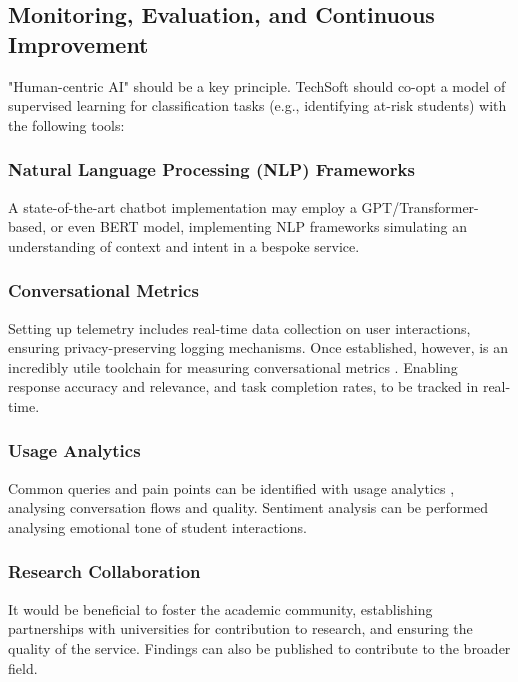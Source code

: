 \documentclass[14pt,a4paper]{article}
\begin{document}
\begin{multicols}{2}
\subsection{Monitoring, Evaluation, and Continuous Improvement}
 "Human-centric AI" should be a key principle.
 TechSoft should co-opt a model of supervised learning for classification tasks (e.g., identifying at-risk students) with the following tools:

\subsubsection{Natural Language Processing (NLP) Frameworks}
A state-of-the-art chatbot implementation may employ a GPT/Transformer-based, or even BERT model, implementing NLP frameworks \textit{\parencite[pp. 1-15]{JurafskyMartin2024}} simulating an understanding of context and intent in a bespoke service.

\subsubsection{Conversational Metrics}
Setting up telemetry \textit{\parencite[pp. 30-60]{Vadapalli2023}} includes real-time data collection on user interactions, ensuring privacy-preserving logging mechanisms. Once established, however, is an incredibly utile toolchain for measuring conversational metrics \textit{\parencite[pp. 1-32]{Quarteroni2024}}.
Enabling response accuracy and relevance, and task completion rates, to be tracked in real-time.


\subsubsection{Usage Analytics}
Common queries and pain points can be identified with usage analytics \textit{\parencite[pp. 50-100]{Beasley2023}}, analysing conversation flows and quality.
Sentiment analysis \textit{\parencite[pp. 50-100]{Liu2023}} can be performed analysing emotional tone of student interactions.

\subsubsection*{Research Collaboration}
    It would be beneficial to foster the academic community, establishing partnerships with universities \textit{\parencite[pp. 50-100]{Dillenbourg2023}} for contribution to research, and ensuring the quality of the service. Findings can also be published to contribute to the broader field.


\end{multicols}
\end{document}
